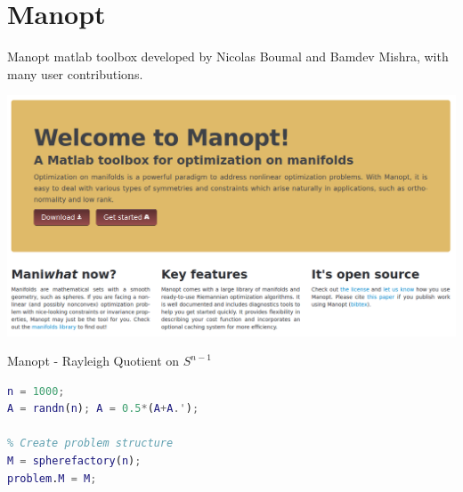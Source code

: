 \documentclass[xcolor=dvipsnames,t]{beamer} %
\begin{document}
\section{Manopt}
\begin{frame}{Manopt}{}
   {\sc matlab} toolbox developed by Nicolas Boumal and Bamdev Mishra, with many user contributions.
   \begin{center}
      \includegraphics[width=\textwidth]{figures/manopt_org.png}
   \end{center}
\end{frame}

%
%
%
%
%
%

\begin{frame}[fragile]{Manopt - Rayleigh Quotient on $S^{n-1}$}
   
   \begin{lstlisting}[language=Matlab]
% Generate symmetric matrix
n = 1000;
A = randn(n); A = 0.5*(A+A.');

% Create problem structure
M = spherefactory(n);
problem.M = M;
   \end{lstlisting}

\end{frame}
\end{document}
